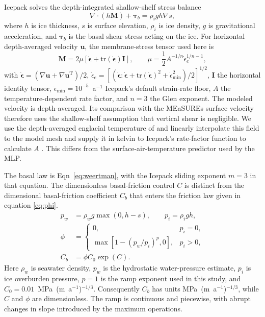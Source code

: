 \documentclass[review,jog]{igs}
\begin{document}
Icepack solves the depth-integrated shallow-shelf stress balance
\begin{equation}
\label{eq:ssa_tensor}
\nabla\!\cdot\!\left(h\mathbf{M}\right)+\boldsymbol{\tau}_b
=\rho_i g h\nabla s,
\end{equation}
where $h$ is ice thickness, $s$ is surface elevation, $\rho_i$ is ice
density, $g$ is gravitational acceleration, and $\boldsymbol{\tau}_b$ is
the basal shear stress acting on the ice. For horizontal depth-averaged velocity $\mathbf{u}$, the membrane-stress tensor used here is
\begin{equation}
\label{eq:membrane_stress}
\mathbf{M}=2\mu\left[\dot{\boldsymbol{\epsilon}}
+\mathrm{tr}(\dot{\boldsymbol{\epsilon}})\mathbf{I}\right],\qquad
\mu=\frac{1}{2}A^{-1/n}\dot{\epsilon}_e^{1/n-1},
\end{equation}
with $\dot{\boldsymbol{\epsilon}}= (\nabla\mathbf{u}+\nabla\mathbf{u}^{\mathrm T})/2$, $\dot{\epsilon}_e=\left[(\dot{\boldsymbol{\epsilon}}: \dot{\boldsymbol{\epsilon}}+\mathrm{tr}(\dot{\boldsymbol{\epsilon}})^2 +\dot{\epsilon}_{\min}^2)/2\right]^{1/2}$, $\mathbf{I}$ the horizontal identity tensor, $\dot{\epsilon}_{\min}=10^{-5}$~a$^{-1}$ Icepack's default strain-rate floor, $A$ the temperature-dependent rate factor, and $n=3$ the Glen exponent. The modeled velocity is depth-averaged. Its comparison with the MEaSUREs surface velocity therefore uses the shallow-shelf assumption that vertical shear is negligible. We use the depth-averaged englacial temperature of \citet{van2013using} and linearly interpolate this field to the model mesh and supply it in kelvin to Icepack's rate-factor function to calculate $A$ \citep{shapero2021icepack}. This differs from the surface-air-temperature predictor used by the MLP.

The basal law is Eqn~\ref{eq:weertman}, with the Icepack sliding exponent $m=3$ in that equation. The dimensionless basal-friction control $C$ is distinct from the dimensional basal-friction coefficient $C_b$ that enters the friction law given in equation \ref{eq:phi}.
\begin{equation}
\label{eq:phi}
\begin{split}
p_w&=\rho_w g\max(0,h-s),\qquad p_i=\rho_i g h,\\
\phi&=
\begin{cases}
0, & p_i=0,\\
\max\!\left[1-\left(p_w/p_i\right)^p,0\right], & p_i>0,
\end{cases}\\
C_b&=\phi C_0\exp(C).
\end{split}
\end{equation}
Here $\rho_w$ is seawater density, $p_w$ is the hydrostatic water-pressure
estimate, $p_i$ is ice overburden pressure, $p=1$ is the ramp exponent used
in this study, and $C_0=0.01$~MPa~(m~a$^{-1}$)$^{-1/3}$. Consequently $C_b$ has
units MPa~(m~a$^{-1}$)$^{-1/3}$, while $C$ and $\phi$ are dimensionless.
The ramp is continuous and piecewise, with abrupt changes in slope introduced by the maximum
operations.
\end{document}
